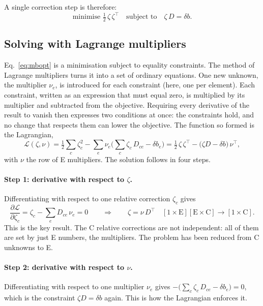 \documentclass[11pt]{article}
\begin{document}
A single correction step is therefore:
\begin{equation}
  \text{minimise } \tfrac12\, \zeta\,\zeta^{\!\top}
  \quad\text{subject to}\quad \zeta\, D = \delta b .
  \label{eq:mbopt}
\end{equation}

\subsection{Solving with Lagrange multipliers}
\label{sec:mb-lagrange}

Eq.~\eqref{eq:mbopt} is a minimisation subject to equality constraints. The method of
Lagrange multipliers turns it into a set of ordinary equations. One new unknown, the
multiplier $\nu_e$, is introduced for each constraint (here, one per element). Each
constraint, written as an expression that must equal zero, is multiplied by its multiplier
and subtracted from the objective. Requiring every derivative of the result to vanish then
expresses two conditions at once: the constraints hold, and no change that respects them
can lower the objective. The function so formed is the Lagrangian,
\begin{equation}
  \mathcal{L}(\zeta, \nu)
  = \tfrac12 \sum_c \zeta_c^2
    - \sum_e \nu_e \Big( \sum_c \zeta_c\, D_{ce} - \delta b_e \Big)
  = \tfrac12\, \zeta\,\zeta^{\!\top} - \big( \zeta D - \delta b \big)\, \nu^{\!\top},
  \label{eq:lagrangian}
\end{equation}
with $\nu$ the row of E multipliers. The solution follows in four steps.

\paragraph{Step 1: derivative with respect to $\zeta$.} Differentiating with respect to one
relative correction $\zeta_c$ gives
\begin{equation}
  \frac{\partial \mathcal{L}}{\partial \zeta_c} = \zeta_c - \sum_e D_{ce}\, \nu_e = 0
  \qquad\Longrightarrow\qquad
  \zeta = \nu\, D^{\!\top}
  \quad [1\times\text{E}][\text{E}\times\text{C}] \to [1\times\text{C}].
  \label{eq:ystat}
\end{equation}
This is the key result. The C relative corrections are not independent: all of them are set
by just E numbers, the multipliers. The problem has been reduced from C unknowns to E.

\paragraph{Step 2: derivative with respect to $\nu$.} Differentiating with respect to one
multiplier $\nu_e$ gives $-\big(\sum_c \zeta_c\, D_{ce} - \delta b_e\big) = 0$, which is the
constraint $\zeta D = \delta b$ again. This is how the Lagrangian enforces it.
\end{document}
